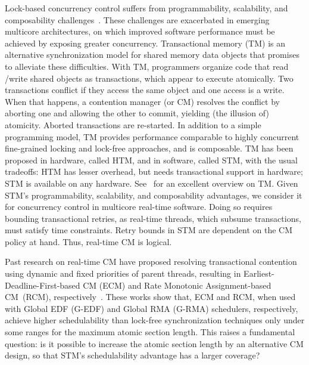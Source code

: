 \documentclass[conference]{sig-alternate}
\begin{document}
Lock-based concurrency control suffers from programmability, scalability, and composability challenges~\cite{Herlihy:2006:AMP:1146381.1146382}. These challenges are exacerbated in emerging multicore architectures, on which improved software performance must be achieved by exposing greater concurrency.  Transactional memory (TM) is an alternative synchronization model for shared memory data objects that promises to alleviate these difficulties.  With TM, programmers organize code that read /write shared objects as transactions, which appear to execute atomically. Two transactions conflict if they access the same object and one access is a write. When that happens, a contention manager (or CM)
resolves the conflict by aborting one and allowing the other to commit, yielding (the illusion of) atomicity. Aborted transactions are re-started.
In addition to a simple programming model, TM provides performance comparable to highly concurrent fine-grained locking and lock-free approaches,  
and is composable. 
TM has been proposed in hardware, called HTM,  
and in software, called STM,  
with the usual tradeoffs: HTM has lesser overhead, but needs transactional support in hardware; STM is available on any hardware. See~\cite{tm-book10} for an excellent overview on TM.
Given STM's programmability, scalability, and composability advantages, we consider it for concurrency control in multicore real-time software. Doing so requires bounding transactional  retries, as real-time threads, which subsume transactions, must satisfy time constraints.  Retry bounds in STM are dependent on the CM policy at hand. Thus, real-time CM is logical.

Past research on real-time CM have proposed resolving transactional contention using dynamic and fixed priorities of parent threads, resulting in Earliest-Deadline-First-based CM (ECM) and Rate Monotonic Assignment-based CM~(RCM), respectively~\cite{fahmy2009bounding,fahmy2009response,stmconcurrencycontrol:emsoft11}.
These works show that, ECM and RCM, when used with Global EDF (G-EDF) and Global RMA  (G-RMA) schedulers, respectively, achieve higher schedulability than lock-free synchronization techniques only under some ranges for the maximum atomic section length. This raises a fundamental question: is it possible to increase the atomic section length by an alternative CM design, so that STM's schedulability advantage has a larger coverage? 
\end{document}
